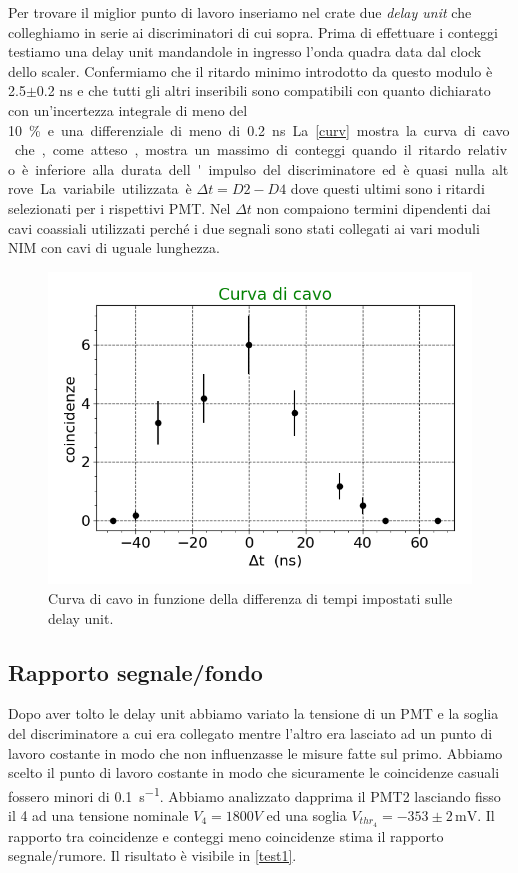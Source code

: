\documentclass[a4paper]{article}
\begin{document}
Per trovare il miglior punto di lavoro inseriamo nel crate due \emph{delay unit} che colleghiamo in serie ai discriminatori di cui sopra. Prima di effettuare i conteggi testiamo una delay unit mandandole in ingresso l'onda quadra data dal clock dello scaler. Confermiamo che il ritardo minimo introdotto da questo modulo è 2.5$\pm$0.2\! ns e che tutti gli altri inseribili sono compatibili con quanto dichiarato con un'incertezza integrale di meno del \SI{10}\% e una differenziale di meno di \SI{0.2}{ns}. La \autoref{curv} mostra la curva di cavo che, come atteso, mostra un massimo di conteggi quando il ritardo relativo è inferiore alla durata dell'impulso del discriminatore ed è quasi nulla altrove. La variabile utilizzata è $\Delta t=D2-D4$ dove questi ultimi sono i ritardi selezionati per i rispettivi PMT. Nel $\Delta t$ non compaiono termini dipendenti dai cavi coassiali utilizzati perché i due segnali sono stati collegati ai vari moduli NIM con cavi di uguale lunghezza.

\begin{figure}[h]
\centering
\includegraphics[width=8 cm]{curva_cavo}
\caption{Curva di cavo in funzione della differenza di tempi impostati sulle delay unit.}
\label{curv}
\end{figure}



\subsection*{Rapporto segnale/fondo}

%

Dopo aver tolto le delay unit abbiamo variato la tensione di un PMT  e la soglia del discriminatore a cui era collegato mentre l'altro era lasciato ad un punto di lavoro costante in modo che non influenzasse le misure fatte sul primo.
Abbiamo scelto il punto di lavoro costante in modo che sicuramente le coincidenze casuali fossero minori di \SI{0.1}{s^{-1}}.
Abbiamo analizzato dapprima il PMT2 lasciando fisso il 4 ad una tensione nominale $V_4=\SI{1800} V$ ed una soglia $V_{thr_4}=-353\pm2\,\mathrm{mV}$. 
Il rapporto tra coincidenze e conteggi meno coincidenze stima il rapporto segnale/rumore.
Il risultato è visibile in \autoref{test1}.
\end{document}
